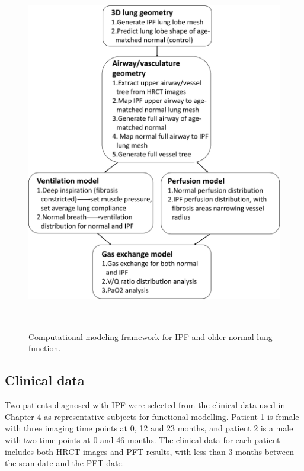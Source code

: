 \begin{figure}[htbp]
  \centering 
  \includegraphics[height=6.2in]{ModelBasedAnalysis/Image/WholeFramework.png}
  \caption{Computational modeling framework for IPF and older normal lung function. }
  \label{fig:WholeFramework}
\end{figure}

\subsection{Clinical data} \label{ClinicalData}
Two patients diagnosed with IPF were selected from the clinical data used in Chapter 4 as representative subjects for functional modelling. Patient 1 is female with three imaging time points at 0, 12 and 23 months, and patient 2 is a male with two time points at 0 and 46 months. The clinical data for each patient includes both HRCT images and PFT results, with less than 3 months between the scan date and the PFT date. 


